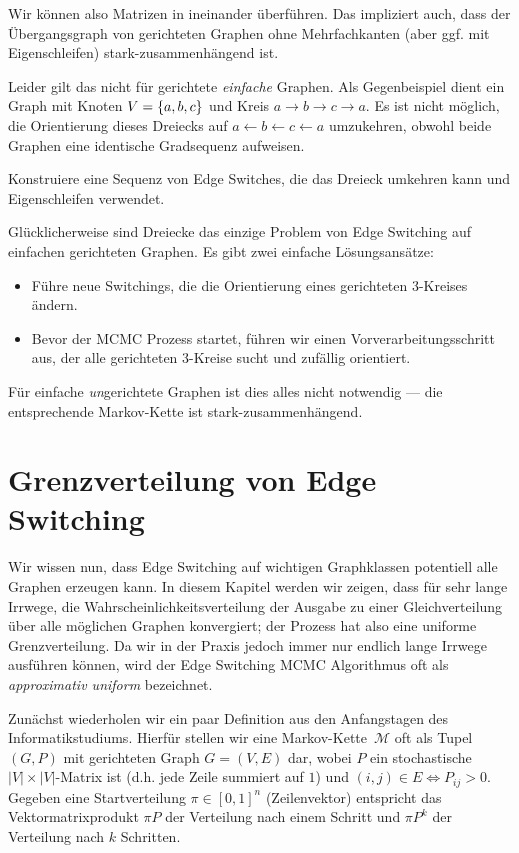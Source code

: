 Wir können also Matrizen in \msz ineinander überführen.
Das impliziert auch, dass der Übergangsgraph von gerichteten Graphen ohne Mehrfachkanten (aber ggf. mit Eigenschleifen) stark-zusammenhängend ist.

Leider gilt das nicht für gerichtete \emph{einfache} Graphen.
Als Gegenbeispiel dient ein Graph mit Knoten $V = \left\{a,b,c\right\}$ und Kreis $a \to b \to c \to a$.
Es ist nicht möglich, die Orientierung dieses Dreiecks auf $a \leftarrow b \leftarrow c \leftarrow a$ umzukehren, obwohl beide Graphen eine identische Gradsequenz aufweisen.

\begin{exercise}
    Konstruiere eine Sequenz von Edge Switches, die das Dreieck umkehren kann und Eigenschleifen verwendet.
\end{exercise}

Glücklicherweise sind Dreiecke das einzige Problem von Edge Switching auf einfachen gerichteten Graphen.
Es gibt zwei einfache Lösungsansätze:
\begin{itemize}
    \item Führe neue Switchings, die die Orientierung eines gerichteten 3-Kreises ändern.
    \item Bevor der MCMC Prozess startet, führen wir einen Vorverarbeitungsschritt aus, der alle gerichteten 3-Kreise sucht und zufällig orientiert.
\end{itemize}

Für einfache \emph{un}gerichtete Graphen ist dies alles nicht notwendig --- die entsprechende Markov-Kette ist stark-zusammenhängend.

\section{Grenzverteilung von Edge Switching}
Wir wissen nun, dass Edge Switching auf wichtigen Graphklassen potentiell alle Graphen erzeugen kann.
In diesem Kapitel werden wir zeigen, dass für sehr lange Irrwege, die Wahrscheinlichkeitsverteilung der Ausgabe zu einer Gleichverteilung über alle möglichen Graphen konvergiert;
der Prozess hat also eine uniforme Grenzverteilung.
Da wir in der Praxis jedoch immer nur endlich lange Irrwege ausführen können, wird der Edge Switching MCMC Algorithmus oft als \emph{approximativ uniform} bezeichnet.

Zunächst wiederholen wir ein paar Definition aus den Anfangstagen des Informatikstudiums.
Hierfür stellen wir eine Markov-Kette~$\mathcal M$ oft als Tupel $(G, P)$ mit gerichteten Graph $G = (V, E)$ dar, wobei $P$ ein stochastische $|V| \times |V|$-Matrix ist (d.h. jede Zeile summiert auf $1$) und $(i, j) \in E \Leftrightarrow P_{ij} > 0$.
Gegeben eine Startverteilung $\pi \in [0, 1]^n$ (Zeilenvektor) entspricht das Vektormatrixprodukt $\pi P$ der Verteilung nach einem Schritt und $\pi P^k$ der Verteilung nach $k$ Schritten.

